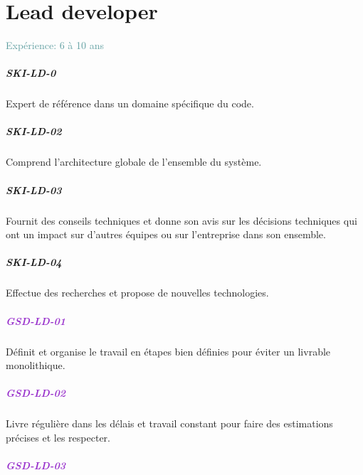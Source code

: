 \documentclass[a4paper, french, openany, 12pt]{book}
\newcommand\dex[1]{\textcolor{BrickRed}{\textbf{\uppercase{ski-{#1}}}}}
\newcommand\str[1]{\textcolor{DarkOrchid}{\textbf{\uppercase{gsd-{#1}}}}}
\newcommand\xp[1]{\textcolor{CadetBlue}{Expérience: {#1} ans}}
\begin{document}
\chapter{Lead developer}

\xp{6 à 10}

\begin{multicols}{2}

  \paragraph*{\dex{ld-0}}

  Expert de référence dans un domaine spécifique du code.

  \paragraph*{\dex{ld-02}}

  Comprend l'architecture globale de l'ensemble du système.

  \paragraph*{\dex{ld-03}}

  Fournit des conseils techniques et donne son avis sur les décisions techniques qui ont un impact sur d'autres équipes ou
  sur l'entreprise dans son ensemble. 

  \paragraph*{\dex{ld-04}}

  Effectue des recherches et propose de nouvelles technologies.

  \paragraph*{\str{ld-01}}

  Définit et organise le travail en étapes bien définies pour éviter un livrable monolithique.

  \paragraph*{\str{ld-02}}

  Livre régulière dans les délais et travail constant pour faire des estimations précises et les respecter.

  \paragraph*{\str{ld-03}}


\end{multicols}
\end{document}
